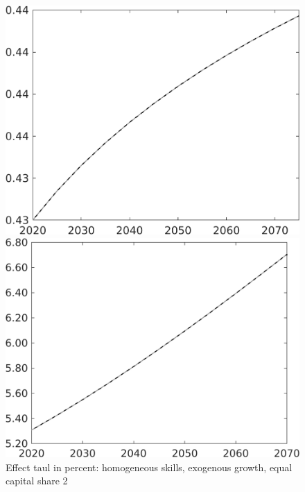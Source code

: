 \documentclass[12pt]{article}
\begin{document}
\begin{figure}[h!!]
	\centering
	\caption{Effect taul in percent: homogeneous skills, exogenous growth, equal capital share 2}\label{fig:LF_BAU_nsk1_xgr1_equalcapShare_know2}
	
	\begin{minipage}[]{0.32\textwidth}
		\includegraphics[width=1\textwidth]{../../codding_model/own_basedOnFried/optimalPol_010922_revision/figures/all_13Sept22/CompTaul_Equlab_LFBAU_Reg0_EY_spillover0_nsk1_xgr1_knspil0_sep1_countec0_GovRev0_etaa0.79_lgd0.png}
	\end{minipage}	
	\begin{minipage}[]{0.32\textwidth}
		\includegraphics[width=1\textwidth]{../../codding_model/own_basedOnFried/optimalPol_010922_revision/figures/all_13Sept22/CompTaul_Equlab_LFBAU_Reg0_gAn_spillover0_nsk1_xgr1_knspil0_sep1_countec0_GovRev0_etaa0.79_lgd0.png}

\end{minipage}
\end{figure}
\end{document}
